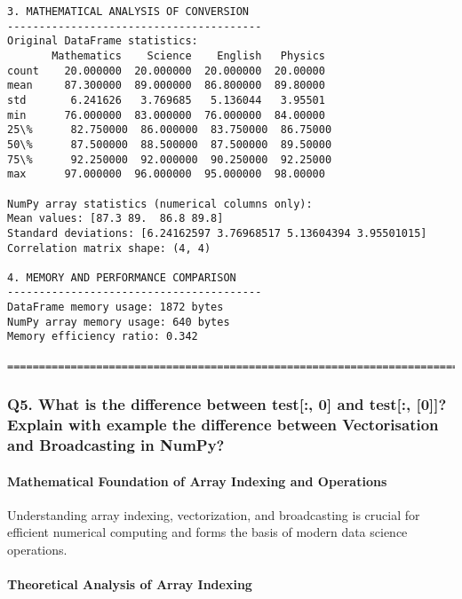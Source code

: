 \documentclass[11pt]{article}
\begin{document}
\begin{Verbatim}[commandchars=\\\{\}]
3. MATHEMATICAL ANALYSIS OF CONVERSION
----------------------------------------
Original DataFrame statistics:
       Mathematics    Science    English   Physics
count    20.000000  20.000000  20.000000  20.00000
mean     87.300000  89.000000  86.800000  89.80000
std       6.241626   3.769685   5.136044   3.95501
min      76.000000  83.000000  76.000000  84.00000
25\%      82.750000  86.000000  83.750000  86.75000
50\%      87.500000  88.500000  87.500000  89.50000
75\%      92.250000  92.000000  90.250000  92.25000
max      97.000000  96.000000  95.000000  98.00000

NumPy array statistics (numerical columns only):
Mean values: [87.3 89.  86.8 89.8]
Standard deviations: [6.24162597 3.76968517 5.13604394 3.95501015]
Correlation matrix shape: (4, 4)

4. MEMORY AND PERFORMANCE COMPARISON
----------------------------------------
DataFrame memory usage: 1872 bytes
NumPy array memory usage: 640 bytes
Memory efficiency ratio: 0.342

================================================================================
    \end{Verbatim}

    \subsubsection{Q5. What is the difference between test{[}:, 0{]} and
test{[}:, {[}0{]}{]}? Explain with example the difference between
Vectorisation and Broadcasting in
NumPy?}\label{q5.-what-is-the-difference-between-test-0-and-test-0-explain-with-example-the-difference-between-vectorisation-and-broadcasting-in-numpy}

\paragraph{Mathematical Foundation of Array Indexing and
Operations}\label{mathematical-foundation-of-array-indexing-and-operations}

Understanding array indexing, vectorization, and broadcasting is crucial
for efficient numerical computing and forms the basis of modern data
science operations.

\paragraph{Theoretical Analysis of Array
Indexing}\label{theoretical-analysis-of-array-indexing}
\end{document}
